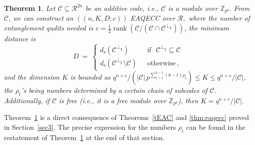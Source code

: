 \documentclass{article}
\DeclareMathOperator{\rank}{rank}
\newtheorem{thm}{Theorem}[section]
\newtheorem{cor}{Corollary}[section]
\theoremstyle{remark}
\theoremstyle{definition}
\numberwithin{equation}{section}
\begin{document}
  \begin{thm}\label{dt1} Let $\mathcal{C} \subseteq \mathcal{R}^{2n}$ be an additive code,  i.e.,  $\mathcal{C}$ is a module over $\mathbb{Z}_{p^b}.$  From $\mathcal{C}$, we can construct an $((n,K, D; c))$ EAQECC over $\mathcal{R},$ where  the number of entanglement qudits needed is $c = \frac12 \rank(\mathcal{C}/(\mathcal{C} \cap \mathcal{C}^{\perp_{{\chi}}}))$, the minimum distance is
\begin{equation*}
D~=~\left\{\begin{array}{ll}
d_{\mathrm{s}}(\mathcal{C}^{\perp_\chi}) & \text{~~if~~} \mathcal{C}^{\perp_\chi} \subseteq \mathcal{C} \\
d_{\mathrm{s}}(\mathcal{C}^{\perp_\chi}\setminus \mathcal{C}) & \text{~~otherwise} \, ,
\end{array}\right. 
\end{equation*}
and the dimension $K$ is bounded as $q^{n+c}/ (|\mathcal{C}| \, {p^{\sum_{t=1}^{b-1} (b-t)\rho_t}}) \leq  K \leq q^{n+c}/|\mathcal{C}|$, the $\rho_t$'s being numbers determined by a certain chain of subcodes of $\mathcal{C}$. Additionally, if $\mathcal{C}$ is free (i.e., it is a free module over $\mathbb{Z}_{p^b}$), then $K = q^{n+c}/|\mathcal{C}|$.
 \end{thm}

Theorem~\ref{dt1} is a direct consequence of Theorems~\ref{tEAC} and \ref{thm:eaqecc} proved in Section~\ref{sec3}. The precise expression for the numbers $\rho_t$ can be found in the restatement of Theorem~\ref{dt1} at the end of that section.

%
\end{document}
